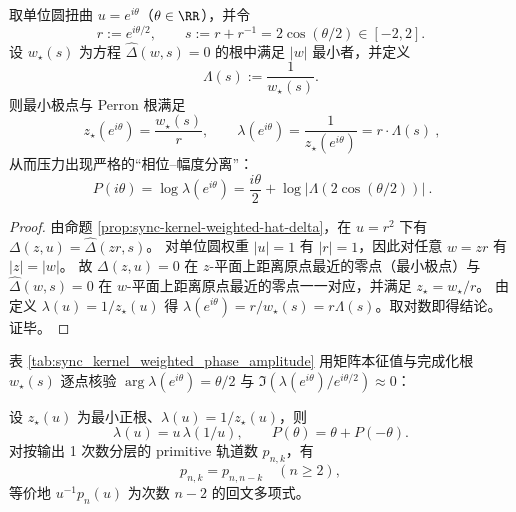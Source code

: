 \begin{corollary}[单位圆扭曲的相位--幅度分离：\texorpdfstring{$P(i\theta)=\frac{i\theta}{2}+\log|\Lambda(s)|$}{P(i theta)=i theta/2 + log|Lambda(s)|}]\label{cor:sync-kernel-weighted-phase-amplitude}
取单位圆扭曲 \(u=e^{i\theta}\)（\(\theta\in\RR\)），并令
\[
r:=e^{i\theta/2},\qquad s:=r+r^{-1}=2\cos(\theta/2)\in[-2,2].
\]
设 \(w_\star(s)\) 为方程 \(\widehat\Delta(w,s)=0\) 的根中满足 \(|w|\) 最小者，并定义
\[
\Lambda(s):=\frac{1}{w_\star(s)}.
\]
则最小极点与 Perron 根满足
\[
\boxed{\ z_\star(e^{i\theta})=\frac{w_\star(s)}{r},\qquad \lambda(e^{i\theta})=\frac{1}{z_\star(e^{i\theta})}=r\cdot \Lambda(s)\ },
\]
从而压力出现严格的“相位--幅度分离”：
\[
\boxed{\ P(i\theta)=\log\lambda(e^{i\theta})=\frac{i\theta}{2}+\log|\Lambda(2\cos(\theta/2))|\ }.
\]
\end{corollary}
\begin{proof}
由命题 \ref{prop:sync-kernel-weighted-hat-delta}，在 \(u=r^2\) 下有
\(
\Delta(z,u)=\widehat\Delta(zr,s)
\)。
对单位圆权重 \(|u|=1\) 有 \(|r|=1\)，因此对任意 \(w=zr\) 有 \(|z|=|w|\)。
故 \(\Delta(z,u)=0\) 在 \(z\)-平面上距离原点最近的零点（最小极点）与 \(\widehat\Delta(w,s)=0\) 在 \(w\)-平面上距离原点最近的零点一一对应，并满足 \(z_\star=w_\star/r\)。
由定义 \(\lambda(u)=1/z_\star(u)\) 得 \(\lambda(e^{i\theta})=r/w_\star(s)=r\Lambda(s)\)。取对数即得结论。证毕。
\end{proof}

\begin{remark}\label{rem:sync-kernel-weighted-phase-amplitude-table}
表 \ref{tab:sync_kernel_weighted_phase_amplitude} 用矩阵本征值与完成化根 \(w_\star(s)\) 逐点核验
\(\arg\lambda(e^{i\theta})=\theta/2\) 与 \(\Im(\lambda(e^{i\theta})/e^{i\theta/2})\approx 0\)：

\end{remark}
设 $z_\star(u)$ 为最小正根、$\lambda(u)=1/z_\star(u)$，则
\[
\lambda(u)=u\,\lambda(1/u),
\qquad
P(\theta)=\theta+P(-\theta).
\]
对按输出 1 次数分层的 primitive 轨道数 $p_{n,k}$，有
\[
p_{n,k}=p_{n,n-k}\quad(n\ge 2),
\]
等价地 $u^{-1}p_n(u)$ 为次数 $n-2$ 的回文多项式。

